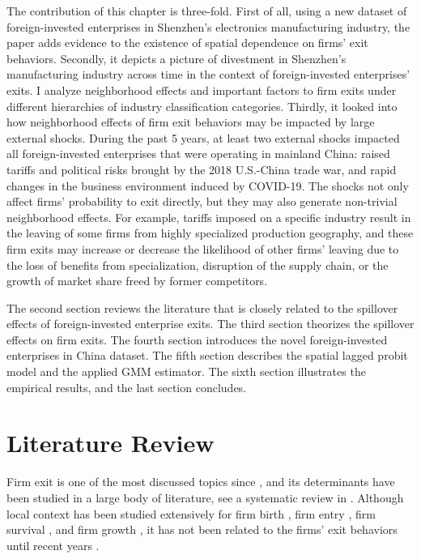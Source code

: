 The contribution of this chapter is three-fold. First of all, using a new dataset of foreign-invested enterprises in Shenzhen's electronics manufacturing industry, the paper adds evidence to the existence of spatial dependence on firms' exit behaviors. Secondly, it depicts a picture of divestment in Shenzhen's manufacturing industry across time in the context of foreign-invested enterprises' exits. I analyze neighborhood effects and important factors to firm exits under different hierarchies of industry classification categories. Thirdly, it looked into how neighborhood effects of firm exit behaviors may be impacted by large external shocks. During the past 5 years, at least two external shocks impacted all foreign-invested enterprises that were operating in mainland China: raised tariffs and political risks brought by the 2018 U.S.-China trade war, and rapid changes in the business environment induced by COVID-19. The shocks not only affect firms' probability to exit directly, but they may also generate non-trivial neighborhood effects. For example, tariffs imposed on a specific industry result in the leaving of some firms from highly specialized production geography, and these firm exits may increase or decrease the likelihood of other firms' leaving due to the loss of benefits from specialization, disruption of the supply chain, or the growth of market share freed by former competitors.

The second section reviews the literature that is closely related to the spillover effects of foreign-invested enterprise exits. The third section theorizes the spillover effects on firm exits. The fourth section introduces the novel foreign-invested enterprises in China dataset. The fifth section describes the spatial lagged probit model and the applied GMM estimator. The sixth section illustrates the empirical results, and the last section concludes.

\section{Literature Review}

Firm exit is one of the most discussed topics since \cite{baldwin1991firm}, and its determinants have been studied in a large body of literature, see a systematic review in \cite{cefis2022understanding}. Although local context has been studied extensively for firm birth \cite{cala2016regional,audretsch2015regional,lee2013regional,levratto2014does}, firm entry \cite{cheratian2021spatial}, firm survival \cite{huiban2011spatial,craioveanu2016impact}, and firm growth \cite{levratto2016does}, it has not been related to the firms' exit behaviors until recent years \cite{weterings2015spatial,ferragina2015agglomeration}.

